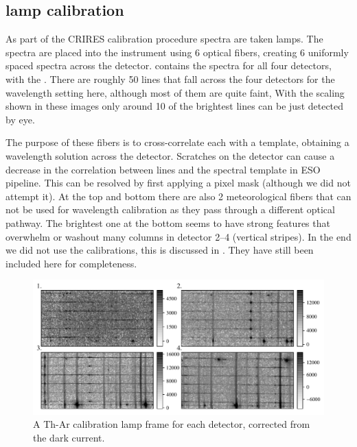 

\subsection{{\thar} lamp calibration}
As part of the CRIRES calibration procedure spectra are taken {\thar} lamps. The {\thar} spectra are placed into the instrument using 6 optical fibers, creating 6 uniformly spaced spectra across the detector.
 contains the {\thar} spectra for all four detectors, with the {\thar}. There are roughly 50 {\thar} lines that fall across the four detectors for the wavelength setting here, although most of them are quite faint, With the scaling shown in these images only around 10 of the brightest lines can be just detected by eye. 

The purpose of these fibers is to cross-correlate each with a {\thar} template, obtaining a wavelength solution across the detector. Scratches on the detector can cause a decrease in the correlation between {\thar} lines and the spectral template in ESO pipeline. This can be resolved by first applying a pixel mask (although we did not attempt it). At the top and bottom there are also 2 meteorological fibers that can not be used for wavelength calibration as they pass through a different optical pathway.  The brightest one at the bottom seems to have strong features that overwhelm or washout many columns in detector 2--4 (vertical stripes). 
In the end we did not use the {\thar} calibrations, this is discussed in . They have still been included here for completeness.

\begin{figure}
\includegraphics[width=\hsize]{./figures/reduction/lamp_plots_cbar_each.pdf}
\caption{A Th-Ar calibration lamp frame for each detector, corrected from the dark current.}
    \label{fig:caliblamps}
\end{figure}

